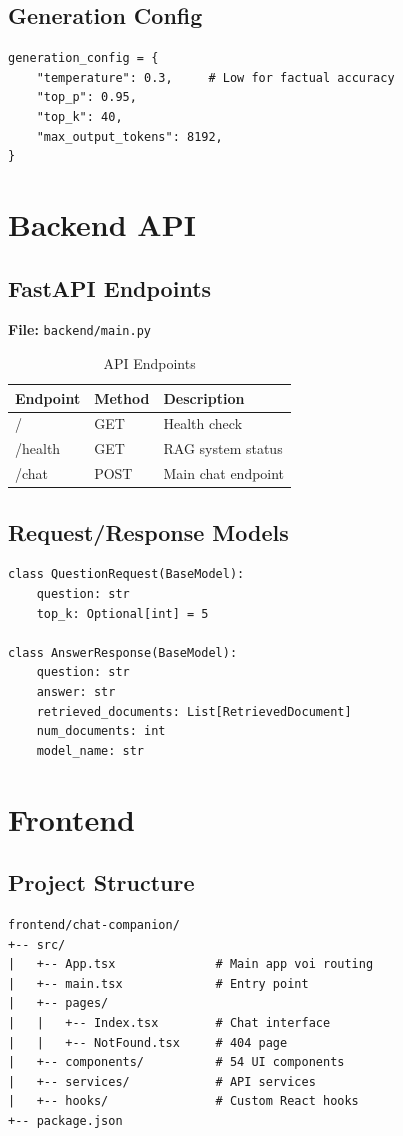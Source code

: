 \documentclass[../DoAn.tex]{subfiles}
\begin{document}
\subsection{Generation Config}
\begin{verbatim}
generation_config = {
    "temperature": 0.3,     # Low for factual accuracy
    "top_p": 0.95,
    "top_k": 40,
    "max_output_tokens": 8192,
}
\end{verbatim}

\section{Backend API}

\subsection{FastAPI Endpoints}
\textbf{File:} \texttt{backend/main.py}

\begin{table}[h]
\centering
\begin{tabular}{|l|l|l|}
\hline
\textbf{Endpoint} & \textbf{Method} & \textbf{Description} \\
\hline
/ & GET & Health check \\
\hline
/health & GET & RAG system status \\
\hline
/chat & POST & Main chat endpoint \\
\hline
\end{tabular}
\caption{API Endpoints}
\end{table}

\subsection{Request/Response Models}
\begin{verbatim}
class QuestionRequest(BaseModel):
    question: str
    top_k: Optional[int] = 5

class AnswerResponse(BaseModel):
    question: str
    answer: str
    retrieved_documents: List[RetrievedDocument]
    num_documents: int
    model_name: str
\end{verbatim}

\section{Frontend}

\subsection{Project Structure}
\begin{verbatim}
frontend/chat-companion/
+-- src/
|   +-- App.tsx              # Main app voi routing
|   +-- main.tsx             # Entry point
|   +-- pages/
|   |   +-- Index.tsx        # Chat interface
|   |   +-- NotFound.tsx     # 404 page
|   +-- components/          # 54 UI components
|   +-- services/            # API services
|   +-- hooks/               # Custom React hooks
+-- package.json
\end{verbatim}
\end{document}
